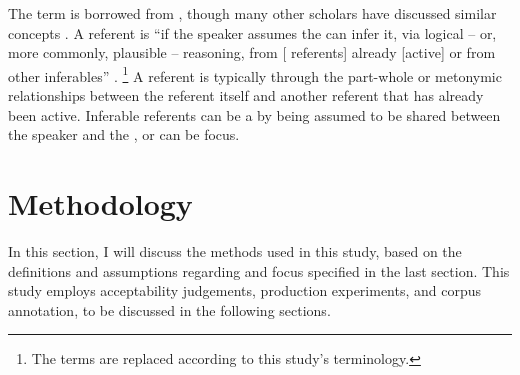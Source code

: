 The term  is borrowed from ,
though many other scholars have discussed similar concepts \cite[e.g.,][]{havilandclark74,chafe94}.
A  referent is 
``if the speaker assumes the  can infer it, via logical --  or, more commonly, plausible -- reasoning, from [ referents] already [active] or from other inferables'' \cite[][p.\ 236]{prince81}.%
	\footnote{
	The terms are replaced according to this study's terminology.
	}
A referent is  typically through
the part-whole or metonymic relationships between the referent itself and another referent that has already been active.
Inferable referents can be a 
by being assumed to be shared between the speaker and the ,
or can be focus.



%
%

\section{Methodology}\label{FrameworkTFIdent}

In this section,
I will discuss the methods used in this study,
based on the definitions and assumptions regarding  and focus specified in the last section.
This study employs acceptability judgements,
production experiments, and
corpus annotation,
to be discussed in the following sections.


